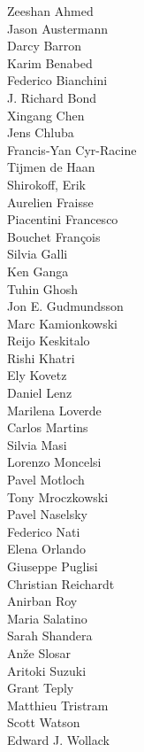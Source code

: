 \documentclass[PICOReport.tex]{subfiles}
\begin{document}
\footnotesize {

\begin{multicols}{4}
Zeeshan Ahmed    \\
Jason Austermann    \\
Darcy Barron    \\
Karim Benabed    \\
Federico Bianchini    \\
J. Richard Bond    \\
Xingang Chen    \\
Jens Chluba    \\
Francis-Yan Cyr-Racine    \\
Tijmen de Haan    \\
Shirokoff, Erik    \\
Aurelien Fraisse    \\
Piacentini Francesco    \\
Bouchet François    \\
Silvia Galli    \\
Ken Ganga    \\
Tuhin Ghosh    \\
Jon E. Gudmundsson    \\
Marc Kamionkowski    \\
Reijo Keskitalo    \\
Rishi Khatri    \\
Ely Kovetz    \\
Daniel Lenz    \\
Marilena Loverde    \\
Carlos Martins    \\
Silvia Masi    \\
Lorenzo Moncelsi    \\
Pavel Motloch    \\
Tony Mroczkowski    \\
Pavel Naselsky    \\
Federico Nati    \\
Elena Orlando    \\
Giuseppe Puglisi    \\
Christian Reichardt    \\
Anirban Roy    \\
Maria Salatino    \\
Sarah Shandera    \\
An\v{z}e Slosar    \\
Aritoki Suzuki    \\
Grant Teply    \\
Matthieu Tristram    \\
Scott Watson    \\
Edward J. Wollack    
\end{multicols}

}
\end{document}
